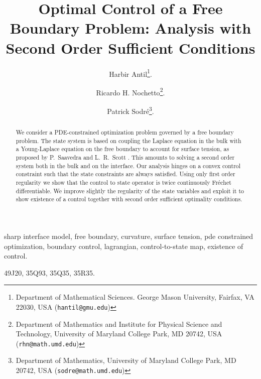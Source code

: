 \documentclass[final]{siamltex}
\title{Optimal Control of a  Free Boundary Problem: Analysis with Second Order Sufficient Conditions
}
\author{Harbir Antil\thanks{Department of Mathematical Sciences. George Mason University, Fairfax, VA 22030, USA ({\tt hantil@gmu.edu})}. 
\and Ricardo H. Nochetto\thanks{Department of Mathematics and Institute for Physical Science and Technology, University of Maryland
College Park, MD 20742, USA ({\tt rhn@math.umd.edu})}. 
\and Patrick Sodr{\'e}\thanks{Department of Mathematics, 
University of Maryland College Park, MD 20742, USA ({\tt sodre@math.umd.edu})}.}
\begin{document}
\maketitle
\begin{abstract}
We consider a PDE-constrained optimization problem governed 
by a free boundary problem. The state system is based on coupling the Laplace equation in the  bulk with a
Young-Laplace equation on the free boundary to account for surface tension, as proposed by P.\ Saavedra and L.\
R.\ Scott \cite{PSaavedra_RScott_1991}. This amounts to solving
a second order system both in the bulk and on the interface. Our analysis hinges on a convex 
control constraint such that the state constraints are always satisfied. Using only
first order regularity we show that the control to state operator is twice continuously Fr\'echet
differentiable. We improve slightly the regularity of the state variables and exploit it to show existence of a control together with second order sufficient optimality conditions. 
\end{abstract}
\begin{keywords} sharp interface model, free boundary, curvature, 
                                surface tension, pde constrained optimization, boundary control, 
                                lagrangian, control-to-state map, existence of control.
\end{keywords}
\begin{AMS}49J20, 35Q93, 35Q35, 35R35. \end{AMS}
\end{document}
